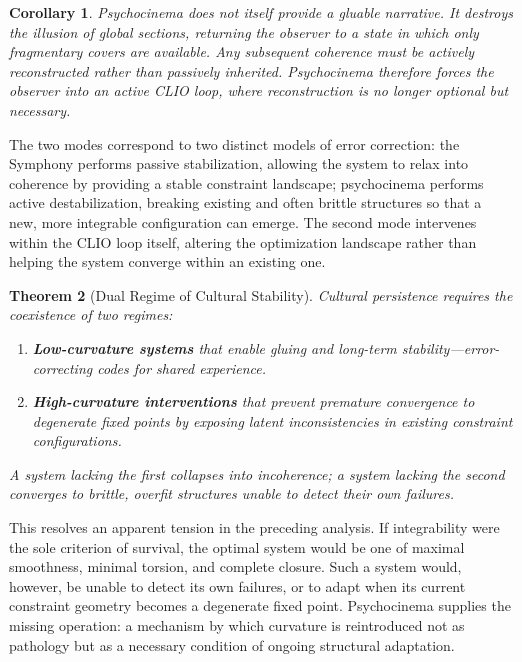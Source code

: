 \documentclass[12pt, oneside]{article}
\theoremstyle{plain}
\newtheorem{theorem}{Theorem}[section]
\newtheorem{corollary}[theorem]{Corollary}
\theoremstyle{definition}
\theoremstyle{remark}
\begin{document}
\begin{corollary}
Psychocinema does not itself provide a gluable narrative. It
destroys the illusion of global sections, returning the observer
to a state in which only fragmentary covers are available. Any
subsequent coherence must be actively reconstructed rather than
passively inherited. Psychocinema therefore forces the observer
into an active CLIO loop, where reconstruction is no longer
optional but necessary.
\end{corollary}

The two modes correspond to two distinct models of error correction:
the Symphony performs passive stabilization, allowing the system
to relax into coherence by providing a stable constraint landscape;
psychocinema performs active destabilization, breaking existing and
often brittle structures so that a new, more integrable
configuration can emerge. The second mode intervenes within the
CLIO loop itself, altering the optimization landscape rather than
helping the system converge within an existing one.

\begin{theorem}[Dual Regime of Cultural Stability]
\label{thm:dual-regime}
Cultural persistence requires the coexistence of two regimes:
\begin{enumerate}
  \item \textbf{Low-curvature systems} that enable gluing and
  long-term stability---error-correcting codes for shared experience.
  \item \textbf{High-curvature interventions} that prevent premature
  convergence to degenerate fixed points by exposing latent
  inconsistencies in existing constraint configurations.
\end{enumerate}
A system lacking the first collapses into incoherence; a system
lacking the second converges to brittle, overfit structures unable
to detect their own failures.
\end{theorem}

This resolves an apparent tension in the preceding analysis. If
integrability were the sole criterion of survival, the optimal
system would be one of maximal smoothness, minimal torsion, and
complete closure. Such a system would, however, be unable to detect
its own failures, or to adapt when its current constraint geometry
becomes a degenerate fixed point. Psychocinema supplies the missing
operation: a mechanism by which curvature is reintroduced not as
pathology but as a necessary condition of ongoing structural
adaptation.
\end{document}
